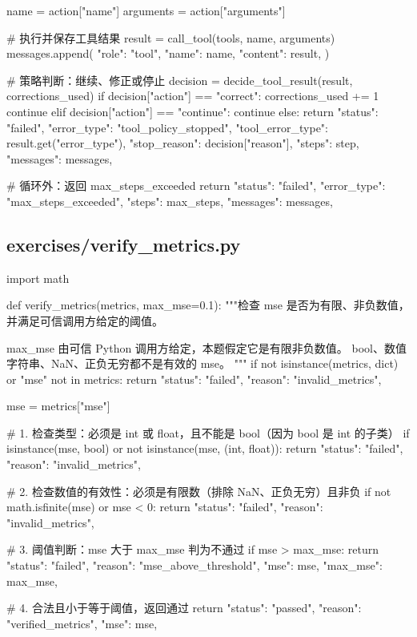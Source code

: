\documentclass[UTF8,zihao=-4,fontset=fandol]{ctexart}
\begin{document}
\begin{Code}
        name = action["name"]
        arguments = action["arguments"]

        # 执行并保存工具结果
        result = call_tool(tools, name, arguments)
        messages.append({
            "role": "tool",
            "name": name,
            "content": result,
        })

        # 策略判断：继续、修正或停止
        decision = decide_tool_result(result, corrections_used)
        if decision["action"] == "correct":
            corrections_used += 1
            continue
        elif decision["action"] == "continue":
            continue
        else:
            return {
                "status": "failed",
                "error_type": "tool_policy_stopped",
                "tool_error_type": result.get("error_type"),
                "stop_reason": decision["reason"],
                "steps": step,
                "messages": messages,
            }

    # 循环外：返回 max_steps_exceeded
    return {
        "status": "failed",
        "error_type": "max_steps_exceeded",
        "steps": max_steps,
        "messages": messages,
    }
\end{Code}

\subsection{exercises/verify\_metrics.py}

\begin{Code}
import math


def verify_metrics(metrics, max_mse=0.1):
    """检查 mse 是否为有限、非负数值，并满足可信调用方给定的阈值。

    max_mse 由可信 Python 调用方给定，本题假定它是有限非负数值。
    bool、数值字符串、NaN、正负无穷都不是有效的 mse。
    """
    if not isinstance(metrics, dict) or "mse" not in metrics:
        return {
            "status": "failed",
            "reason": "invalid_metrics",
        }

    mse = metrics["mse"]
    
    # 1. 检查类型：必须是 int 或 float，且不能是 bool（因为 bool 是 int 的子类）
    if isinstance(mse, bool) or not isinstance(mse, (int, float)):
        return {
            "status": "failed",
            "reason": "invalid_metrics",
        }
    
    # 2. 检查数值的有效性：必须是有限数（排除 NaN、正负无穷）且非负
    if not math.isfinite(mse) or mse < 0:
        return {
            "status": "failed",
            "reason": "invalid_metrics",
        }
    
    # 3. 阈值判断：mse 大于 max_mse 判为不通过
    if mse > max_mse:
        return {
            "status": "failed",
            "reason": "mse_above_threshold",
            "mse": mse,
            "max_mse": max_mse,
        }
    
    # 4. 合法且小于等于阈值，返回通过
    return {
        "status": "passed",
        "reason": "verified_metrics",
        "mse": mse,
    }
\end{Code}
\end{document}
